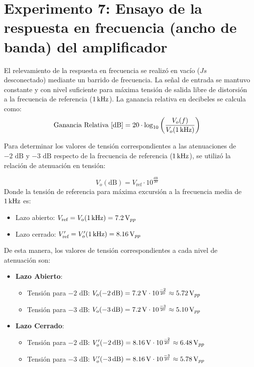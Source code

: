 \section{Experimento 7: Ensayo de la respuesta en frecuencia (ancho de banda) del amplificador}
El relevamiento de la respuesta en frecuencia se realizó en vacío ($Js$ desconectado) mediante un barrido de frecuencia.
La señal de entrada se mantuvo constante y con nivel suficiente para máxima tensión de salida libre de distorsión
a la frecuencia de referencia ($1\,\mathrm{kHz}$). La ganancia relativa en decibeles se calcula como:
\begin{equation}
    \text{Ganancia Relativa [dB]} = 20 \cdot \log_{10} \left( \frac{V_o(f)}{V_o(1\,\mathrm{kHz})} \right)
\end{equation}

Para determinar los valores de tensión correspondientes a las atenuaciones de
$-2\text{ dB}$ y $-3\text{ dB}$ respecto de la frecuencia de referencia
($1\,\mathrm{kHz}$), se utilizó la relación de atenuación en tensión:

\begin{equation}
    V_o(\text{dB}) = V_{\text{ref}} \cdot 10^{\frac{\text{dB}}{20}}
\end{equation}
Donde la tensión de referencia para máxima excursión a la frecuencia media de $1\,\mathrm{kHz}$ es:
\begin{itemize}
    \item Lazo abierto: $V_{\text{ref}} = V_o(1\,\mathrm{kHz}) = 7.2\,\mathrm{V}_{pp}$
    \item Lazo cerrado: $V_{\text{ref}}' = V_o'(1\,\mathrm{kHz}) = 8.16\,\mathrm{V}_{pp}$
\end{itemize}

De esta manera, los valores de tensión correspondientes a cada nivel de atenuación son:
\begin{itemize}
    \item \textbf{Lazo Abierto}:
          \begin{itemize}
              \item Tensión para $-2\text{ dB}$: $V_o(-2\,\mathrm{dB}) = 7.2\,\mathrm{V} \cdot 10^{\frac{-2}{20}} \approx 5.72\,\mathrm{V}_{pp}$
              \item Tensión para $-3\text{ dB}$: $V_o(-3\,\mathrm{dB}) = 7.2\,\mathrm{V} \cdot 10^{\frac{-3}{20}} \approx 5.10\,\mathrm{V}_{pp}$
          \end{itemize}
    \item \textbf{Lazo Cerrado}:
          \begin{itemize}
              \item Tensión para $-2\text{ dB}$: $V_o'(-2\,\mathrm{dB}) = 8.16\,\mathrm{V} \cdot 10^{\frac{-2}{20}} \approx 6.48\,\mathrm{V}_{pp}$
              \item Tensión para $-3\text{ dB}$: $V_o'(-3\,\mathrm{dB}) = 8.16\,\mathrm{V} \cdot 10^{\frac{-3}{20}} \approx 5.78\,\mathrm{V}_{pp}$
          \end{itemize}
\end{itemize}

